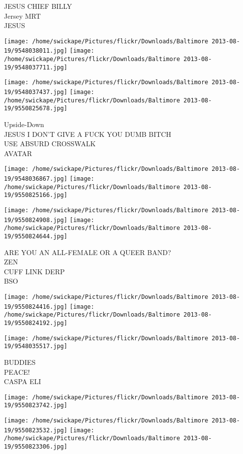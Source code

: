 \documentclass[10pt,letterpaper]{article}
\begin{document}
JESUS CHIEF BILLY\\
Jersey MRT\\
JESUS
\pagebreak

\texttt{[image: /home/swickape/Pictures/flickr/Downloads/Baltimore 2013-08-19/9548038011.jpg]}
\texttt{[image: /home/swickape/Pictures/flickr/Downloads/Baltimore 2013-08-19/9548037711.jpg]}

\texttt{[image: /home/swickape/Pictures/flickr/Downloads/Baltimore 2013-08-19/9548037437.jpg]}
\texttt{[image: /home/swickape/Pictures/flickr/Downloads/Baltimore 2013-08-19/9550825678.jpg]}

Upside{-}Down\\
JESUS I DON'T GIVE A FUCK YOU DUMB BITCH\\
USE ABSURD CROSSWALK\\
AVATAR
\pagebreak

\texttt{[image: /home/swickape/Pictures/flickr/Downloads/Baltimore 2013-08-19/9548036867.jpg]}
\texttt{[image: /home/swickape/Pictures/flickr/Downloads/Baltimore 2013-08-19/9550825166.jpg]}

\texttt{[image: /home/swickape/Pictures/flickr/Downloads/Baltimore 2013-08-19/9550824908.jpg]}
\texttt{[image: /home/swickape/Pictures/flickr/Downloads/Baltimore 2013-08-19/9550824644.jpg]}

ARE YOU AN ALL{-}FEMALE OR A QUEER BAND?\\
ZEN\\
CUFF LINK DERP\\
BSO
\pagebreak

\texttt{[image: /home/swickape/Pictures/flickr/Downloads/Baltimore 2013-08-19/9550824416.jpg]}
\texttt{[image: /home/swickape/Pictures/flickr/Downloads/Baltimore 2013-08-19/9550824192.jpg]}

\texttt{[image: /home/swickape/Pictures/flickr/Downloads/Baltimore 2013-08-19/9548035517.jpg]}

BUDDIES\\
PEACE!\\
CASPA ELI
\pagebreak

\texttt{[image: /home/swickape/Pictures/flickr/Downloads/Baltimore 2013-08-19/9550823742.jpg]}

\vspace{0.25in}
\texttt{[image: /home/swickape/Pictures/flickr/Downloads/Baltimore 2013-08-19/9550823532.jpg]}
\texttt{[image: /home/swickape/Pictures/flickr/Downloads/Baltimore 2013-08-19/9550823306.jpg]}
\end{document}
